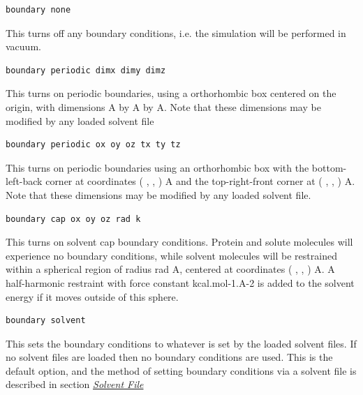 \documentclass[letterpaper,10pt,english]{sphinxmanual}
\begin{document}
\begin{Verbatim}[frame=single,commandchars=\\\{\}]
boundary none
\end{Verbatim}

This turns off any boundary conditions, i.e. the simulation will be performed in vacuum.

\begin{Verbatim}[frame=single,commandchars=\\\{\}]
boundary periodic dimx dimy dimz
\end{Verbatim}

This turns on periodic boundaries, using a orthorhombic box centered on the origin, with dimensions  A by  A by  A. Note that these dimensions may be modified by any loaded solvent file

\begin{Verbatim}[frame=single,commandchars=\\\{\}]
boundary periodic ox oy oz tx ty tz
\end{Verbatim}

This turns on periodic boundaries using an orthorhombic box with the bottom-left-back corner at coordinates ( ,  , ) A and the top-right-front corner at ( ,  , ) A. Note that these dimensions may be modified by any loaded solvent file.

\begin{Verbatim}[frame=single,commandchars=\\\{\}]
boundary cap ox oy oz rad k
\end{Verbatim}

This turns on solvent cap boundary conditions. Protein and solute molecules will experience no boundary conditions, while solvent molecules will be restrained within a spherical region of radius rad A, centered at coordinates ( ,  , ) A. A half-harmonic restraint with force constant  kcal.mol-1.A-2 is added to the solvent energy if it moves outside of this sphere.

\begin{Verbatim}[frame=single,commandchars=\\\{\}]
boundary solvent
\end{Verbatim}

This sets the boundary conditions to whatever is set by the loaded solvent files. If no solvent files are loaded then no boundary conditions are used. This is the default option, and the method of setting boundary conditions via a solvent file is described in section {\hyperref[protoms:solventpdb]{\emph{Solvent File}}}
\end{document}
